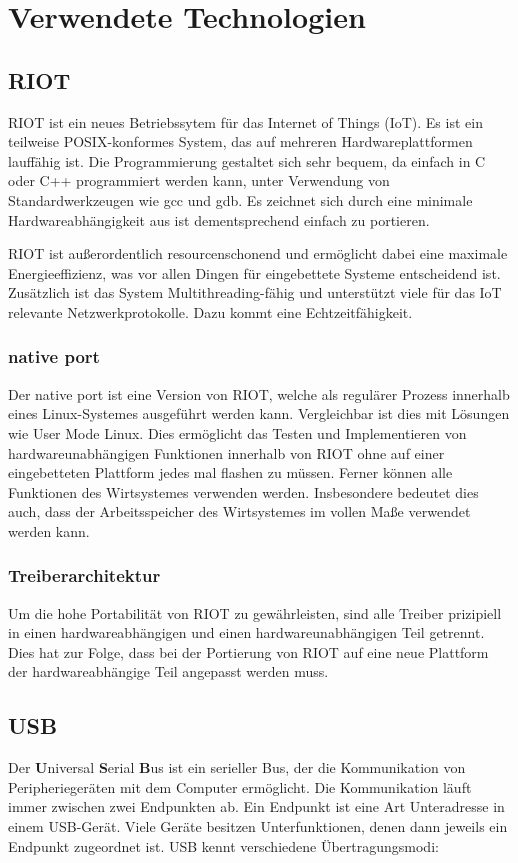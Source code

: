 \section{Verwendete Technologien}

\subsection{RIOT}
RIOT ist ein neues Betriebssytem für das Internet of Things (IoT).
Es ist ein teilweise POSIX-konformes System, das auf mehreren Hardwareplattformen lauffähig ist.
Die Programmierung gestaltet sich sehr bequem, da einfach in C oder C++ programmiert werden kann, unter Verwendung von Standardwerkzeugen wie gcc und gdb.
Es zeichnet sich durch eine minimale Hardwareabhängigkeit aus ist dementsprechend einfach zu portieren.

RIOT ist außerordentlich resourcenschonend und ermöglicht dabei eine maximale Energieeffizienz, was vor allen Dingen für eingebettete Systeme entscheidend ist.
Zusätzlich ist das System Multithreading-fähig und unterstützt viele für das IoT relevante Netzwerkprotokolle. Dazu kommt eine Echtzeitfähigkeit.

\subsubsection{native port}
Der native port ist eine Version von RIOT, welche als regulärer Prozess innerhalb eines Linux-Systemes ausgeführt werden kann.
Vergleichbar ist dies mit Lösungen wie User Mode Linux.
Dies ermöglicht das Testen und Implementieren von hardwareunabhängigen Funktionen innerhalb von RIOT ohne auf einer eingebetteten Plattform jedes mal flashen zu müssen.
Ferner können alle Funktionen des Wirtsystemes verwenden werden.
Insbesondere bedeutet dies auch, dass der Arbeitsspeicher des Wirtsystemes im vollen Maße verwendet werden kann.

\subsubsection{Treiberarchitektur}
Um die hohe Portabilität von RIOT zu gewährleisten, sind alle Treiber prizipiell in einen hardwareabhängigen und einen hardwareunabhängigen Teil getrennt.
Dies hat zur Folge, dass bei der Portierung von RIOT auf eine neue Plattform der hardwareabhängige Teil angepasst werden muss.

\subsection{USB}
Der \textbf{U}niversal \textbf{S}erial \textbf{B}us ist ein serieller Bus, der die Kommunikation von Peripheriegeräten mit dem Computer ermöglicht.
Die Kommunikation läuft immer zwischen zwei Endpunkten ab.
Ein Endpunkt ist eine Art Unteradresse in einem USB-Gerät.
Viele Geräte besitzen Unterfunktionen, denen dann jeweils ein Endpunkt zugeordnet ist.
USB kennt verschiedene Übertragungsmodi:

